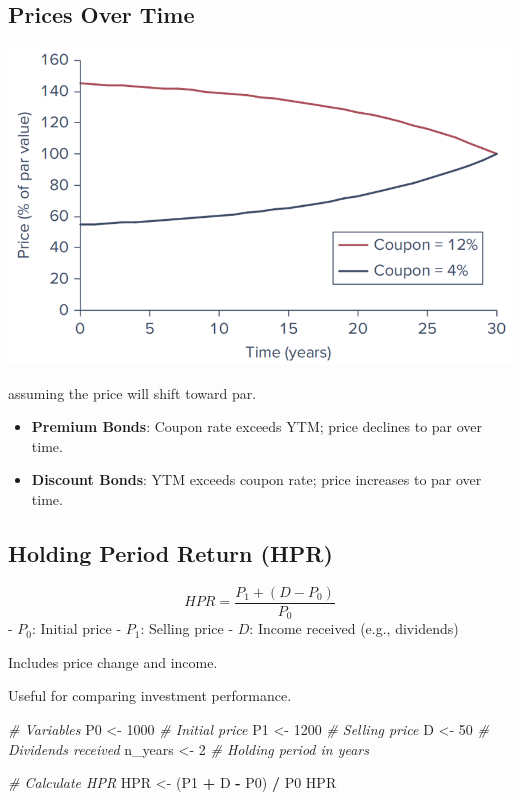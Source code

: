 \documentclass[
]{book}
\newenvironment{Shaded}{\begin{snugshade}}{\end{snugshade}}
\newcommand{\CommentTok}[1]{\textcolor[rgb]{0.56,0.35,0.01}{\textit{#1}}}
\newcommand{\DecValTok}[1]{\textcolor[rgb]{0.00,0.00,0.81}{#1}}
\newcommand{\NormalTok}[1]{#1}
\newcommand{\OtherTok}[1]{\textcolor[rgb]{0.56,0.35,0.01}{#1}}
\newcommand{\SpecialCharTok}[1]{\textcolor[rgb]{0.81,0.36,0.00}{\textbf{#1}}}
\begin{document}
\hypertarget{prices-over-time}{%
\subsection{Prices Over Time}\label{prices-over-time}}

\includegraphics{Resources/parval.png}

assuming the price will shift toward par.

\begin{itemize}
\item
  \textbf{Premium Bonds}: Coupon rate exceeds YTM; price declines to par over time.
\item
  \textbf{Discount Bonds}: YTM exceeds coupon rate; price increases to par over time.
\end{itemize}

\hypertarget{holding-period-return-hpr}{%
\subsection{Holding Period Return (HPR)}\label{holding-period-return-hpr}}

\[
HPR = \frac{P_1 + (D - P_0)}{P_0}
\]
- \(P_0\): Initial price
- \(P_1\): Selling price
- \(D\): Income received (e.g., dividends)

Includes price change and income.

Useful for comparing investment performance.

\begin{Shaded}
\begin{Highlighting}[]
\CommentTok{\# Variables}
\NormalTok{P0 }\OtherTok{\textless{}{-}} \DecValTok{1000}     \CommentTok{\# Initial price}
\NormalTok{P1 }\OtherTok{\textless{}{-}} \DecValTok{1200}      \CommentTok{\# Selling price}
\NormalTok{D }\OtherTok{\textless{}{-}} \DecValTok{50}         \CommentTok{\# Dividends received}
\NormalTok{n\_years }\OtherTok{\textless{}{-}} \DecValTok{2}   \CommentTok{\# Holding period in years}

\CommentTok{\# Calculate HPR}
\NormalTok{HPR }\OtherTok{\textless{}{-}}\NormalTok{ (P1 }\SpecialCharTok{+}\NormalTok{ D }\SpecialCharTok{{-}}\NormalTok{ P0) }\SpecialCharTok{/}\NormalTok{ P0}
\NormalTok{HPR}
\end{Highlighting}
\end{Shaded}
\end{document}
